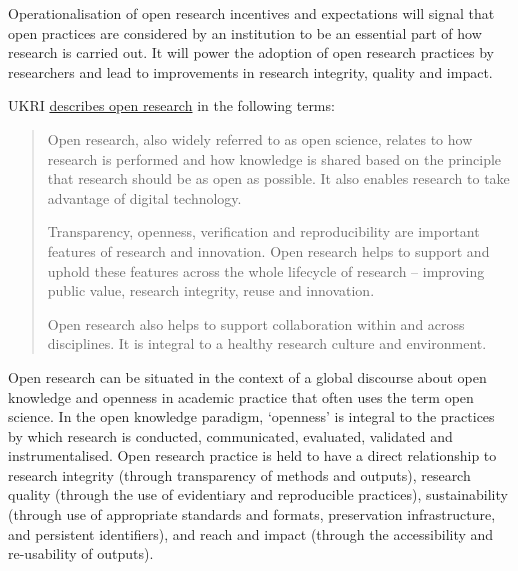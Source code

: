 \documentclass[
  letterpaper,
  DIV=11,
  numbers=noendperiod,
  oneside]{scrreprt}
\begin{document}
Operationalisation of open research incentives and expectations will
signal that open practices are considered by an institution to be an
essential part of how research is carried out. It will power the
adoption of open research practices by researchers and lead to
improvements in research integrity, quality and impact.

\begin{tcolorbox}[enhanced jigsaw, titlerule=0mm, coltitle=black, toprule=.15mm, title=\textcolor{quarto-callout-note-color}{\faInfo}\hspace{0.5em}{Open research and its benefits}, colframe=quarto-callout-note-color-frame, bottomrule=.15mm, opacityback=0, leftrule=.75mm, rightrule=.15mm, arc=.35mm, toptitle=1mm, colbacktitle=quarto-callout-note-color!10!white, opacitybacktitle=0.6, bottomtitle=1mm, breakable, left=2mm, colback=white]

UKRI
\href{https://www.ukri.org/what-we-do/supporting-healthy-research-and-innovation-culture/open-research/}{describes
open research} in the following terms:

\begin{quote}
Open research, also widely referred to as open science, relates to how
research is performed and how knowledge is shared based on the principle
that research should be as open as possible. It also enables research to
take advantage of digital technology.

Transparency, openness, verification and reproducibility are important
features of research and innovation. Open research helps to support and
uphold these features across the whole lifecycle of research --
improving public value, research integrity, reuse and innovation.

Open research also helps to support collaboration within and across
disciplines. It is integral to a healthy research culture and
environment.
\end{quote}

Open research can be situated in the context of a global discourse about
open knowledge and openness in academic practice that often uses the
term open science. In the open knowledge paradigm, `openness' is
integral to the practices by which research is conducted, communicated,
evaluated, validated and instrumentalised. Open research practice is
held to have a direct relationship to research integrity (through
transparency of methods and outputs), research quality (through the use
of evidentiary and reproducible practices), sustainability (through use
of appropriate standards and formats, preservation infrastructure, and
persistent identifiers), and reach and impact (through the accessibility
and re-usability of outputs).

\end{tcolorbox}
\end{document}
